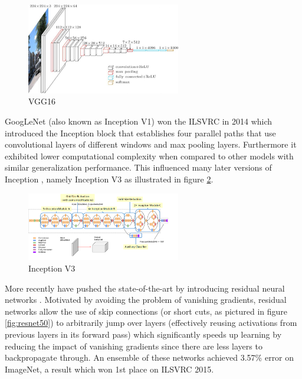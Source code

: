 \begin{figure}[ht]
    \centering
    \includegraphics[width=0.6\textwidth]{figs/vgg16.jpg}
    \caption{VGG16}
    \label{fig:vgg16}
\end{figure}

GoogLeNet \cite{inceptionv1} (also known as Inception V1) won the \ac{ILSVRC} \cite{imagenet} in 2014 which introduced the Inception block that establishes four parallel paths that use convolutional layers of different windows and max pooling layers. Furthermore it exhibited lower computational complexity when compared to other models with similar generalization performance. This influenced many later versions of Inception \cite{inceptionv2_3}\cite{inceptionv4}, namely Inception V3 as illustrated in figure \ref{fig:inceptionv3}.

\begin{figure}[ht]
    \centering
    \includegraphics[width=0.6\textwidth]{figs/inceptionv3.png}
    \caption{Inception V3}
    \label{fig:inceptionv3}
\end{figure}

More recently \citeauthor{resnet} have pushed the state-of-the-art by introducing residual neural networks \cite{resnet}. Motivated by avoiding the problem of vanishing gradients, residual networks allow the use of skip connections (or short cuts, as pictured in figure \ref{fig:resnet50}) to arbitrarily jump over layers (effectively reusing activations from previous layers in its forward pass) which significantly speeds up learning by reducing the impact of vanishing gradients since there are less layers to backpropagate through. An ensemble of these networks achieved 3.57\% error on ImageNet, a result which won 1st place on \ac{ILSVRC} 2015.

